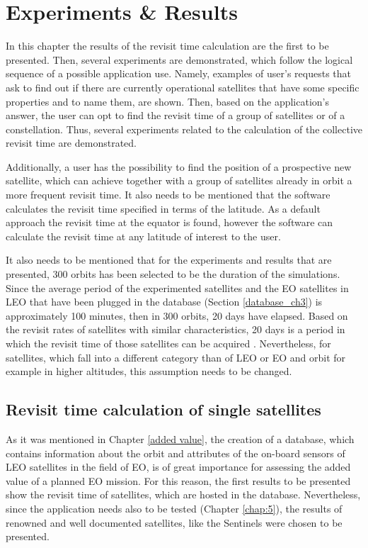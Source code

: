 \chapter{Experiments \& Results}
\label{chap:4}

\bigskip

In this chapter the results of the revisit time calculation are the first to be presented. Then, several experiments are demonstrated, which follow the logical sequence of a possible application use. Namely, examples of user's requests that ask to find out if there are currently operational satellites that have some specific properties and to name them, are shown. Then, based on the application's answer, the user can opt to find the revisit time of a group of satellites or of a constellation. Thus, several experiments related to the calculation of the collective revisit time are demonstrated.

Additionally, a user has the possibility to find the position of a prospective new satellite, which can achieve together with a group of satellites already in orbit a more frequent revisit time. It also needs to be mentioned that the software calculates the revisit time specified in terms of the latitude. As a default approach the revisit time at the equator is found, however the software can calculate the revisit time at any latitude of interest to the user.

It also needs to be mentioned that for the experiments and results that are presented, 300 orbits has been selected to be the duration of the simulations. Since the average period of the experimented satellites and the EO satellites in LEO that have been plugged in the database (Section \ref{database_ch3}) is approximately 100 minutes, then in 300 orbits, 20 days have elapsed. Based on the revisit rates of satellites with similar characteristics, 20 days is a period in which the revisit time of those satellites can be acquired \cite{Christopherson}. Nevertheless, for satellites, which fall into a different category than of LEO or EO and orbit for example in higher altitudes, this assumption needs to be changed.

\bigskip
\section{Revisit time calculation of single satellites}
\bigskip

As it was mentioned in Chapter \ref{added value}, the creation of a database, which contains information about the orbit and attributes of the on-board sensors of LEO satellites in the field of EO, is of great importance for assessing the added value of a planned EO mission. For this reason, the first results to be presented show the revisit time of satellites, which are hosted in the database. Nevertheless, since the application needs also to be tested (Chapter \ref{chap:5}), the results of renowned and well documented satellites, like the Sentinels were chosen to be presented.

